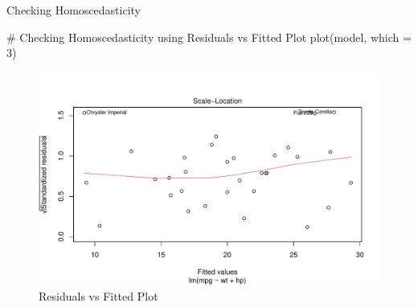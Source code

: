 \documentclass[
  18 pt,
  ignorenonframetext,
  aspectratio=1610,
]{beamer}
\newenvironment{Shaded}{\begin{snugshade}}{\end{snugshade}}
\newcommand{\AttributeTok}[1]{\textcolor[rgb]{0.40,0.45,0.13}{#1}}
\newcommand{\CommentTok}[1]{\textcolor[rgb]{0.37,0.37,0.37}{#1}}
\newcommand{\DecValTok}[1]{\textcolor[rgb]{0.68,0.00,0.00}{#1}}
\newcommand{\FunctionTok}[1]{\textcolor[rgb]{0.28,0.35,0.67}{#1}}
\newcommand{\NormalTok}[1]{\textcolor[rgb]{0.00,0.23,0.31}{#1}}
\begin{document}
\begin{frame}[fragile]{Checking Homoscedasticity}
\protect\hypertarget{checking-homoscedasticity-1}{}
\tiny

\begin{Shaded}
\begin{Highlighting}[]
\CommentTok{\# Checking Homoscedasticity using Residuals vs Fitted Plot}
\FunctionTok{plot}\NormalTok{(model, }\AttributeTok{which =} \DecValTok{3}\NormalTok{)}
\end{Highlighting}
\end{Shaded}

\begin{figure}

{\centering \includegraphics[width=\textwidth,height=0.5\textheight]{R-Regression_files/figure-beamer/unnamed-chunk-21-1.pdf}

}

\caption{Residuals vs Fitted Plot}

\end{figure}

\normalsize
\end{frame}
\end{document}
